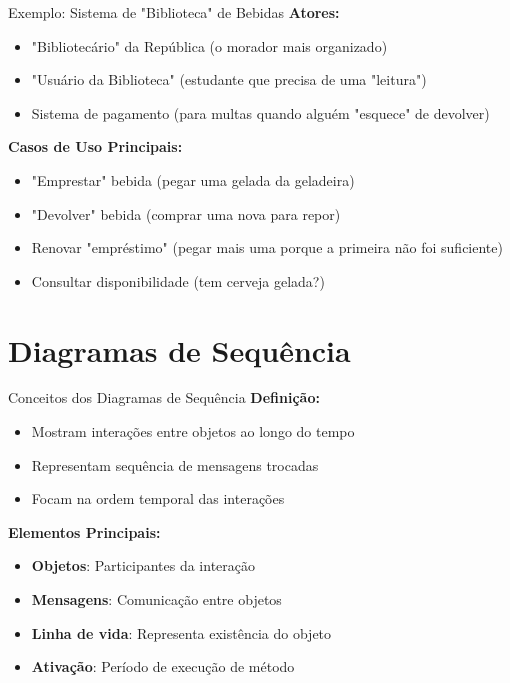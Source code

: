 \documentclass[aspectratio=169]{beamer}
\begin{document}
\begin{frame}{Exemplo: Sistema de "Biblioteca" de Bebidas}
\textbf{Atores:}
\begin{itemize}
\item "Bibliotecário" da República (o morador mais organizado)
\item "Usuário da Biblioteca" (estudante que precisa de uma "leitura")
\item Sistema de pagamento (para multas quando alguém "esquece" de devolver)
\end{itemize}

\vspace{0.5cm}
\textbf{Casos de Uso Principais:}
\begin{itemize}
\item "Emprestar" bebida (pegar uma gelada da geladeira)
\item "Devolver" bebida (comprar uma nova para repor)
\item Renovar "empréstimo" (pegar mais uma porque a primeira não foi suficiente)
\item Consultar disponibilidade (tem cerveja gelada?)
\end{itemize}
\end{frame}

\section{Diagramas de Sequência}

\begin{frame}{Conceitos dos Diagramas de Sequência}
\textbf{Definição:}
\begin{itemize}
\item Mostram interações entre objetos ao longo do tempo
\item Representam sequência de mensagens trocadas
\item Focam na ordem temporal das interações
\end{itemize}

\vspace{0.5cm}
\textbf{Elementos Principais:}
\begin{itemize}
\item \textbf{Objetos}: Participantes da interação
\item \textbf{Mensagens}: Comunicação entre objetos
\item \textbf{Linha de vida}: Representa existência do objeto
\item \textbf{Ativação}: Período de execução de método
\end{itemize}
\end{frame}
\end{document}
